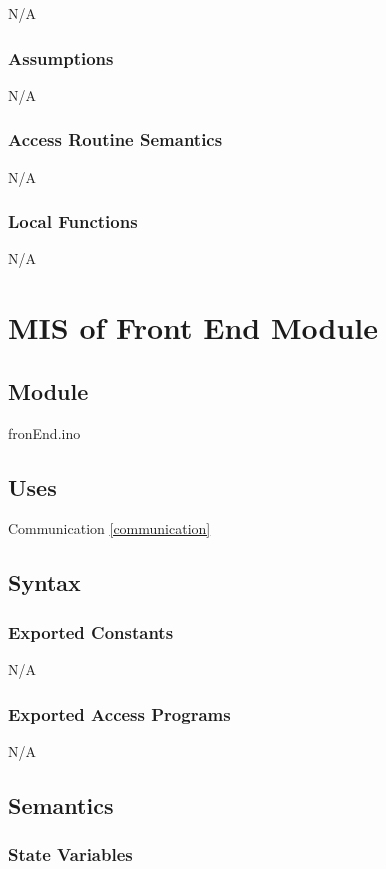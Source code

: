 \documentclass[12pt, titlepage]{article}
\begin{document}
N/A

\subsubsection{Assumptions}

N/A

\subsubsection{Access Routine Semantics}

N/A

\subsubsection{Local Functions}

N/A

  \section{MIS of Front End Module} \label{fronEnd} 

\subsection{Module}

fronEnd.ino

\subsection{Uses}
Communication \ref{communication}

\subsection{Syntax}

\subsubsection{Exported Constants}
N/A
\subsubsection{Exported Access Programs}

N/A

\subsection{Semantics}

\subsubsection{State Variables}
\end{document}

